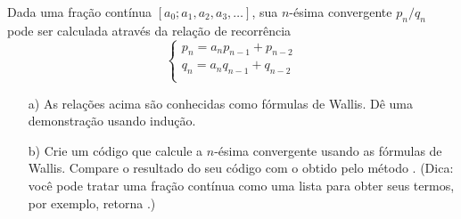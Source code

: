 \begin{exercise}
  Dada uma fração contínua $[a_0;a_1,a_2,a_3,\dots]$, sua
  $n$-ésima convergente $p_n/q_n$ pode ser calculada 
  através da relação de recorrência
  $$
  \begin{cases}
    p_n = a_np_{n-1} + p_{n-2} \\
    q_n = a_nq_{n-1} + q_{n-2} \\
  \end{cases}
  $$
  \begin{itemize}
    \item[a)] As relações acima são conhecidas como fórmulas de Wallis.
    Dê uma demonstração usando indução.
    \item[b)] Crie um código que calcule a $n$-ésima convergente
    usando as fórmulas de Wallis. Compare o resultado do seu código
    com o obtido pelo método .
    (Dica: você pode tratar uma fração contínua  como uma lista para obter seus termos,
  por exemplo,  retorna .)
  \end{itemize}

  
\end{exercise}



